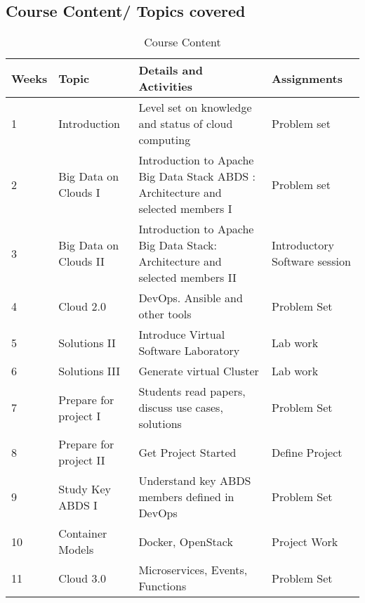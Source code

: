 \subsection{Course Content/ Topics covered} 

\begin{table}[h]
\centering
\caption{Course Content}
\label{T:e616}
\begin{tabular}{p{1cm}p{4cm}p{6cm}p{2cm}}
Weeks & Topic                  & Details and Activities                                                           & Assignments                   \\
\hline
1     & Introduction           & Level set on knowledge and status of cloud computing                             & Problem set                   \\
2     & Big Data on Clouds I   & Introduction to Apache Big Data Stack ABDS : Architecture and selected members I & Problem set                   \\
3     & Big Data on Clouds II  & Introduction to Apache Big Data Stack: Architecture and selected members II      & Introductory Software session \\
4     & Cloud 2.0              & DevOps. Ansible and other tools                                                  & Problem Set                   \\
5     & Solutions II           & Introduce Virtual Software Laboratory                                            & Lab work                      \\
6     & Solutions III          & Generate virtual Cluster                                                         & Lab work                      \\
7     & Prepare for project I  & Students read papers, discuss use cases, solutions                               & Problem Set                   \\
8     & Prepare for project II & Get Project Started                                                              & Define Project                \\
9     & Study Key ABDS I       & Understand key ABDS members defined in DevOps                                    & Problem Set                   \\
10    & Container Models       & Docker, OpenStack                                                                & Project Work                  \\
11    & Cloud 3.0              & Microservices, Events, Functions                                                 & Problem Set                   \\

\end{tabular}
\end{table}
